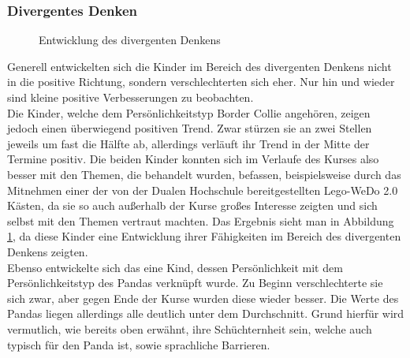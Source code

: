 \subsubsection{Divergentes Denken}
\begin{figure}[H]
	\centering
	\caption{Entwicklung des divergenten Denkens}
	\label{img:developmentDivergent}
\end{figure}	
Generell entwickelten sich die Kinder im Bereich des divergenten Denkens nicht in die positive Richtung, sondern verschlechterten sich eher. Nur hin und wieder sind kleine positive Verbesserungen zu beobachten.\\
Die Kinder, welche dem Persönlichkeitstyp Border Collie angehören, zeigen jedoch einen überwiegend positiven Trend. Zwar stürzen sie an zwei Stellen jeweils um fast die Hälfte ab, allerdings verläuft ihr Trend in der Mitte der Termine positiv. Die beiden Kinder konnten sich im Verlaufe des Kurses also besser mit den Themen, die behandelt wurden, befassen, beispielsweise durch das Mitnehmen einer der von der Dualen Hochschule bereitgestellten \gls{Lego}-WeDo 2.0 Kästen, da sie so auch außerhalb der Kurse großes Interesse zeigten und sich selbst mit den Themen vertraut machten. Das Ergebnis sieht man in Abbildung \ref{img:developmentDivergent}, da diese Kinder eine Entwicklung ihrer Fähigkeiten im Bereich des divergenten Denkens zeigten.\\
Ebenso entwickelte sich das eine Kind, dessen Persönlichkeit mit dem Persönlichkeitstyp des Pandas verknüpft wurde. Zu Beginn verschlechterte sie sich zwar, aber gegen Ende der Kurse wurden diese wieder besser. Die Werte des Pandas liegen allerdings alle deutlich unter dem Durchschnitt. Grund hierfür wird vermutlich, wie bereits oben erwähnt, ihre Schüchternheit sein, welche auch typisch für den Panda ist, sowie sprachliche Barrieren.\\
